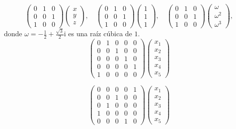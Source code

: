 \begin{ejercicio}
$$
\left(\begin{array}{ccc}
0&1&0 \\
0&0&1 \\
1&0&0  
\end{array}\right)
\left(\begin{array}{c}
x \\
y \\
z
\end{array}\right)
,\quad
\left(\begin{array}{ccc}
0&1&0 \\
0&0&1 \\
1&0&0  
\end{array}\right)
\left(\begin{array}{c}
1 \\
1 \\
1
\end{array}\right)
,\quad
\left(\begin{array}{ccc}
0&1&0 \\
0&0&1 \\
1&0&0  
\end{array}\right)
\left(\begin{array}{c}
\omega \\
\omega^2 \\
\omega^3
\end{array}\right),
$$
donde $\omega=-\frac{1}{2}+\frac{\sqrt{3}}{2}\mathrm{i}$ es una raíz cúbica de $1$.
$$
\left(\begin{array}{ccccc}
0 & 1 & 0 & 0 & 0 \\
0 & 0 & 1 & 0 & 0 \\
0 & 0 & 0 & 1 & 0 \\
0 & 0 & 0 &  0 & 1 \\
1 & 0 & 0 & 0 & 0
\end{array}\right)
\left(\begin{array}{c}
x_1 \\
x_2 \\
x_3 \\
x_4 \\
x_5 
\end{array}\right)
$$

$$\left(\begin{array}{ccccc}
0 & 0 & 0 & 0 & 1 \\
0 & 0 & 1 & 0 & 0 \\
0 & 1 & 0 & 0 & 0 \\
1 & 0 & 0 & 0 & 0 \\
0 & 0 & 0 & 1 & 0
\end{array}\right)
\left(\begin{array}{c}
x_1 \\
x_2 \\
x_3 \\
x_4 \\
x_5 
\end{array}\right)
$$
\end{ejercicio}

